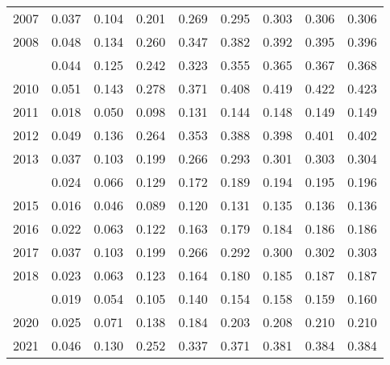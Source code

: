 \documentclass[
]{article}
\begin{document}
\begin{longtable}[t]{lrrrrrrrr}
2007 & 0.037 & 0.104 & 0.201 & 0.269 & 0.295 & 0.303 & 0.306 & 0.306\\
2008 & 0.048 & 0.134 & 0.260 & 0.347 & 0.382 & 0.392 & 0.395 & 0.396\\
\addlinespace
2009 & 0.044 & 0.125 & 0.242 & 0.323 & 0.355 & 0.365 & 0.367 & 0.368\\
2010 & 0.051 & 0.143 & 0.278 & 0.371 & 0.408 & 0.419 & 0.422 & 0.423\\
2011 & 0.018 & 0.050 & 0.098 & 0.131 & 0.144 & 0.148 & 0.149 & 0.149\\
2012 & 0.049 & 0.136 & 0.264 & 0.353 & 0.388 & 0.398 & 0.401 & 0.402\\
2013 & 0.037 & 0.103 & 0.199 & 0.266 & 0.293 & 0.301 & 0.303 & 0.304\\
\addlinespace
2014 & 0.024 & 0.066 & 0.129 & 0.172 & 0.189 & 0.194 & 0.195 & 0.196\\
2015 & 0.016 & 0.046 & 0.089 & 0.120 & 0.131 & 0.135 & 0.136 & 0.136\\
2016 & 0.022 & 0.063 & 0.122 & 0.163 & 0.179 & 0.184 & 0.186 & 0.186\\
2017 & 0.037 & 0.103 & 0.199 & 0.266 & 0.292 & 0.300 & 0.302 & 0.303\\
2018 & 0.023 & 0.063 & 0.123 & 0.164 & 0.180 & 0.185 & 0.187 & 0.187\\
\addlinespace
2019 & 0.019 & 0.054 & 0.105 & 0.140 & 0.154 & 0.158 & 0.159 & 0.160\\
2020 & 0.025 & 0.071 & 0.138 & 0.184 & 0.203 & 0.208 & 0.210 & 0.210\\
2021 & 0.046 & 0.130 & 0.252 & 0.337 & 0.371 & 0.381 & 0.384 & 0.384\\*
\end{longtable}
\end{document}
